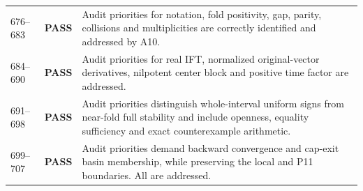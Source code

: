 \documentclass[11pt]{article}
\newcommand{\pass}{\textbf{PASS}}
\begin{document}
\begin{longtable}{@{}p{}p{}p{}@{}}
676--683 & \pass & Audit priorities for notation, fold positivity, gap, parity, collisions and multiplicities are correctly identified and addressed by A10.\\
684--690 & \pass & Audit priorities for real IFT, normalized original-vector derivatives, nilpotent center block and positive time factor are addressed.\\
691--698 & \pass & Audit priorities distinguish whole-interval uniform signs from near-fold full stability and include openness, equality sufficiency and exact counterexample arithmetic.\\
699--707 & \pass & Audit priorities demand backward convergence and cap-exit basin membership, while preserving the local and P11 boundaries. All are addressed.\\
\bottomrule\end{longtable}\normalsize
\end{document}
